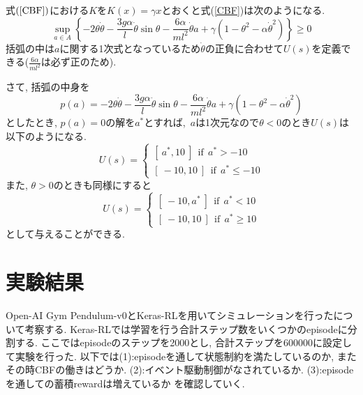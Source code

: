 \documentclass{jsarticle}
\begin{document}
式$(\ref{CBF})$における$K$を$K(x) = \gamma x$とおくと式(\ref{CBF})は次のようになる.
\begin{equation}
	\sup_{a\in A}\left\{-2\theta\dot{\theta}-\frac{3g\alpha}{l}\dot{\theta}\sin{\theta}-\frac{6\alpha}{ml^2}\dot{\theta} a+\gamma(1-\theta^2-\alpha\dot{\theta}^2)\right\} \geq 0 \label{special_cbf}
\end{equation}
括弧の中は$a$に関する1次式となっているため$\dot{\theta}$の正負に合わせて$U(s)$を定義できる($\frac{6\alpha}{ml^2}$は必ず正のため).\par
さて, 括弧の中身を
\begin{equation}
	p(a) = -2\theta\dot{\theta}-\frac{3g\alpha}{l}\dot{\theta}\sin{\theta}-\frac{6\alpha}{ml^2}\dot{\theta} a+\gamma(1-\theta^2-\alpha\dot{\theta}^2)
\end{equation}
としたとき, $p(a)=0$の解を$a^{*}$とすれば,~$a$は1次元なので$\theta<0$のとき$U(s)$は以下のようになる.
\begin{equation}
	U(s) = 
		\begin{cases}
			[~a^{*}, 10~]~~\textrm{if}~~ a^{*} > -10 \\
			[~-10, 10~]~~\textrm{if}~~ a^{*} \leq -10
		\end{cases}
\end{equation}
また, $\theta>0$のときも同様にすると
\begin{equation}
	U(s) = 
		\begin{cases}
			[~-10, a^{*}~]~~\textrm{if}~~ a^{*} < 10 \\
			[~-10, 10~]~~\textrm{if}~~ a^{*} \geq 10
		\end{cases}
\end{equation}
として与えることができる.

\section{実験結果}
Open-AI Gym Pendulum-v0とKeras-RLを用いてシミュレーションを行ったについて考察する. Keras-RLでは学習を行う合計ステップ数をいくつかのepisodeに分割する. ここではepisodeのステップを2000とし, 合計ステップを600000に設定して実験を行った. 以下では(1):episodeを通して状態制約を満たしているのか, またその時CBFの働きはどうか. (2):イベント駆動制御がなされているか. (3):episodeを通しての蓄積rewardは増えているか
を確認していく. 
\end{document}
